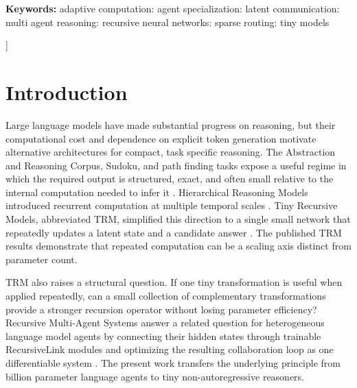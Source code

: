 \documentclass[10pt,a4paper,twocolumn]{article}
\begin{document}
\begin{@twocolumnfalse}
\vspace{0.05in}
\noindent\textbf{Keywords: }adaptive computation: agent specialization: latent communication: multi agent reasoning: recursive neural networks: sparse routing: tiny models
\vspace{0.12in}
\end{@twocolumnfalse}
]

\section{Introduction}
Large language models have made substantial progress on reasoning, but their computational cost and dependence on explicit token generation motivate alternative architectures for compact, task specific reasoning. The Abstraction and Reasoning Corpus, Sudoku, and path finding tasks expose a useful regime in which the required output is structured, exact, and often small relative to the internal computation needed to infer it \cite{chollet2019arc}. Hierarchical Reasoning Models introduced recurrent computation at multiple temporal scales \cite{wang2025hrm}. Tiny Recursive Models, abbreviated TRM, simplified this direction to a single small network that repeatedly updates a latent state and a candidate answer \cite{jolicoeur2025trm}. The published TRM results demonstrate that repeated computation can be a scaling axis distinct from parameter count.

TRM also raises a structural question. If one tiny transformation is useful when applied repeatedly, can a small collection of complementary transformations provide a stronger recursion operator without losing parameter efficiency? Recursive Multi-Agent Systems answer a related question for heterogeneous language model agents by connecting their hidden states through trainable RecursiveLink modules and optimizing the resulting collaboration loop as one differentiable system \cite{yang2026recursivemas}. The present work transfers the underlying principle from billion parameter language agents to tiny non-autoregressive reasoners.
\end{document}
